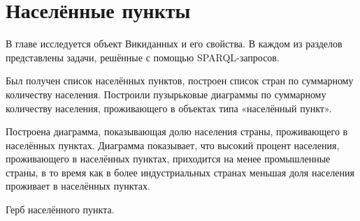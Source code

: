 \chapter{Населённые пункты}
\label{ch:human-settlement}

	В главе исследуется объект Викиданных  и его свойства. В каждом из разделов представлены задачи, решённые с помощью SPARQL-запросов. 


Был получен список населённых пунктов, построен список стран по суммарному количеству населения. Построили пузырьковые диаграммы по суммарному количеству населения,
проживающего в объектах типа «населённый пункт».

Построена диаграмма, показывающая долю населения страны, проживающего в населённых пунктах. Диаграмма показывает, что высокий процент населения, проживающего в населённых пунктах, приходится на менее промышленные страны, в то время как в более индустриальных странах меньшая доля населения проживает в населённых пунктах. 

\begin{marginfigure}[0.0cm] {
\setlength{\fboxsep}{0pt}%
\setlength{\fboxrule}{1pt}%
%
}
  \caption{Герб населённого пункта.}%
  \label{fig:flag_question_human_settlements1}%
\end{marginfigure}

